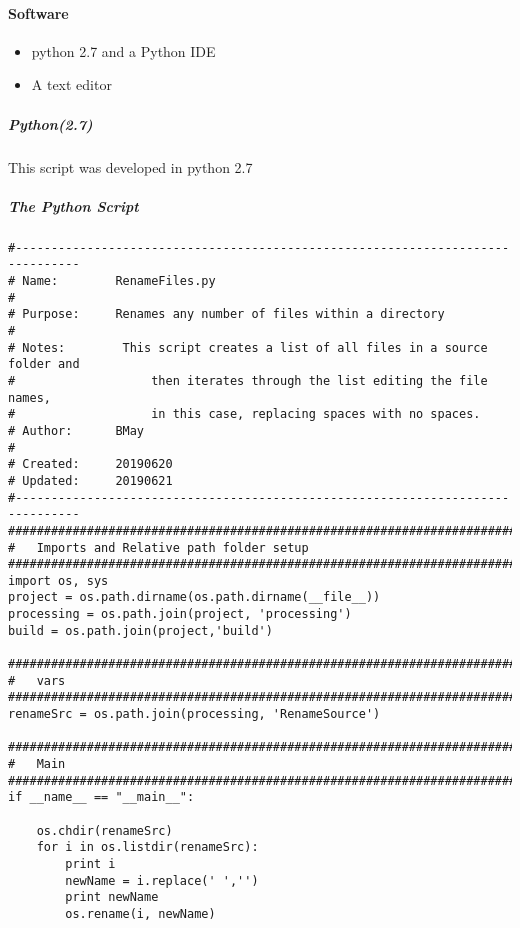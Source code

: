 \paragraph{Software}
\begin{itemize}
\item python 2.7 and a Python IDE
\item A text editor
\end{itemize}
\subparagraph{Python(2.7)} This script was developed in python 2.7
\subparagraph{The Python Script}
{\begin{footnotesize}\color{orange}
\begin{verbatim}
#-------------------------------------------------------------------------------
# Name:        RenameFiles.py
#
# Purpose:     Renames any number of files within a directory
#
# Notes:        This script creates a list of all files in a source folder and
#                   then iterates through the list editing the file names,
#                   in this case, replacing spaces with no spaces.
# Author:      BMay
#
# Created:     20190620
# Updated:	   20190621
#-------------------------------------------------------------------------------
################################################################################
#   Imports and Relative path folder setup
################################################################################
import os, sys
project = os.path.dirname(os.path.dirname(__file__))
processing = os.path.join(project, 'processing')
build = os.path.join(project,'build')

################################################################################
#   vars
################################################################################
renameSrc = os.path.join(processing, 'RenameSource')

################################################################################
#   Main
################################################################################
if __name__ == "__main__":

    os.chdir(renameSrc)
    for i in os.listdir(renameSrc):
        print i
        newName = i.replace(' ','')
        print newName
        os.rename(i, newName)
\end{verbatim}
\end{footnotesize}}

